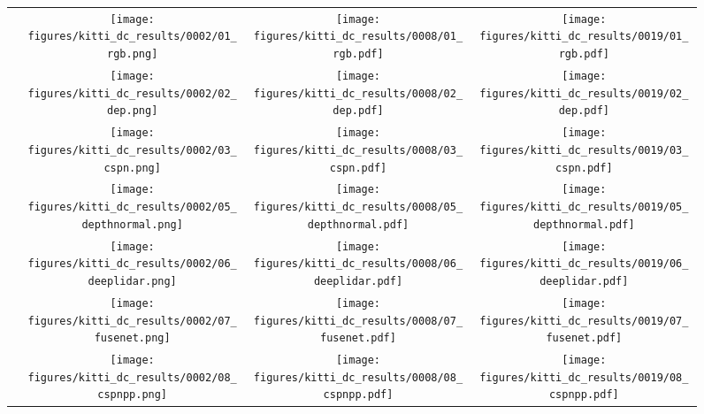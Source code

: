 \documentclass[runningheads]{llncs}
\newcommand{\csmall}{\fontsize{8}{9.5}\selectfont}
\begin{document}
\begin{figure*}[t]
\begin{center}
\renewcommand{\arraystretch}{0.2}
\begin{tabular}{@{}c@{\hskip 0.001\linewidth}c@{\hskip 0.001\linewidth}c@{\hskip 0.001\linewidth}c}
\raisebox{2\height}{{\csmall (a)}}  &
\texttt{[image: figures/kitti\_dc\_results/0002/01\_rgb.png]} &
\texttt{[image: figures/kitti\_dc\_results/0008/01\_rgb.pdf]} &
\texttt{[image: figures/kitti\_dc\_results/0019/01\_rgb.pdf]} \\
\raisebox{2\height}{{\csmall (b)}}  &
\texttt{[image: figures/kitti\_dc\_results/0002/02\_dep.png]} &
\texttt{[image: figures/kitti\_dc\_results/0008/02\_dep.pdf]} &
\texttt{[image: figures/kitti\_dc\_results/0019/02\_dep.pdf]} \\
\raisebox{2\height}{{\csmall (c)}}  &
\texttt{[image: figures/kitti\_dc\_results/0002/03\_cspn.png]} &
\texttt{[image: figures/kitti\_dc\_results/0008/03\_cspn.pdf]} &
\texttt{[image: figures/kitti\_dc\_results/0019/03\_cspn.pdf]} \\
\raisebox{2\height}{{\csmall (d)}}  &
\texttt{[image: figures/kitti\_dc\_results/0002/05\_depthnormal.png]} &
\texttt{[image: figures/kitti\_dc\_results/0008/05\_depthnormal.pdf]} &
\texttt{[image: figures/kitti\_dc\_results/0019/05\_depthnormal.pdf]} \\
\raisebox{2\height}{{\csmall (e)}}  &
\texttt{[image: figures/kitti\_dc\_results/0002/06\_deeplidar.png]} &
\texttt{[image: figures/kitti\_dc\_results/0008/06\_deeplidar.pdf]} &
\texttt{[image: figures/kitti\_dc\_results/0019/06\_deeplidar.pdf]} \\
\raisebox{2\height}{{\csmall (f)}}  &
\texttt{[image: figures/kitti\_dc\_results/0002/07\_fusenet.png]} &
\texttt{[image: figures/kitti\_dc\_results/0008/07\_fusenet.pdf]} &
\texttt{[image: figures/kitti\_dc\_results/0019/07\_fusenet.pdf]} \\
\raisebox{2\height}{{\csmall (g)}}  &
\texttt{[image: figures/kitti\_dc\_results/0002/08\_cspnpp.png]} &
\texttt{[image: figures/kitti\_dc\_results/0008/08\_cspnpp.pdf]} &
\texttt{[image: figures/kitti\_dc\_results/0019/08\_cspnpp.pdf]} \\

\end{tabular}
\end{center}
\end{figure*}
\end{document}

